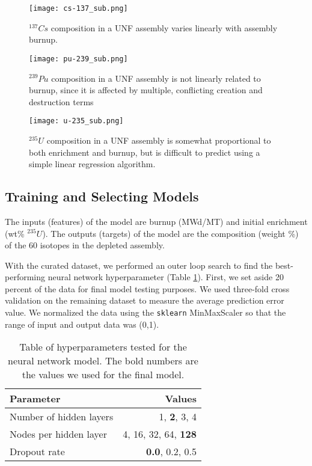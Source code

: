 \begin{figure}
    \centering
    \texttt{[image: cs-137\_sub.png]}
    \caption{$^{137}Cs$ composition in a \gls{UNF} assembly
             varies linearly with assembly burnup.}
    \label{fig:cs_137}
\end{figure}

\begin{figure}
    \centering
    \texttt{[image: pu-239\_sub.png]}
    \caption{$^{239}Pu$ composition in a \gls{UNF} assembly
             is not linearly related to burnup, since it
             is affected by multiple, conflicting creation
             and destruction terms}
    \label{fig:pu_239}
\end{figure}


\begin{figure}
    \centering
    \texttt{[image: u-235\_sub.png]}
    \caption{$^{235}U$ composition in a \gls{UNF} assembly
             is somewhat proportional to both enrichment and
             burnup, but is difficult to predict using
             a simple linear regression algorithm.}
    \label{fig:u_235}
\end{figure}


\subsection{Training and Selecting Models}

The inputs (features) of the model are
burnup (MWd/MT) and initial enrichment (wt\% $^{235}U$).
The outputs (targets) of the model are
the composition (weight \%) of the 60 isotopes in the
depleted assembly.

With the curated dataset, we performed an outer loop
search to find the best-performing neural network
hyperparameter (Table \ref{tab:hyper}). First, we set aside 20 percent of the 
data for final model testing purposes. We used three-fold
cross validation \cite{stone1974cross} on the remaining
dataset to
measure the average prediction error value. We
normalized the data using the \texttt{sklearn} MinMaxScaler
so that the range of input and output data was (0,1).

\begin{table}[h]
    \centering
    \begin{tabular}{lr}
        \hline
        Parameter & Values \\
        \hline
        Number of hidden layers & 1, \textbf{2}, 3, 4 \\
        Nodes per hidden layer & 4, 16, 32, 64, \textbf{128} \\
        Dropout rate & \textbf{0.0}, 0.2, 0.5 \\
        \hline
    \end{tabular}
    \caption{Table of hyperparameters tested
             for the neural network model. The bold
             numbers are the values we used for the final model.}
    \label{tab:hyper}
    
\end{table}


